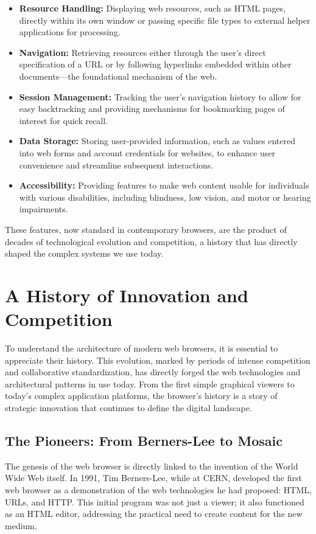 \documentclass{scrbook}
\begin{document}
\begin{itemize}
    \item \textbf{Resource Handling:} Displaying web resources, such as HTML pages, directly within its own window or passing specific file types to external helper applications for processing.
    \item \textbf{Navigation:} Retrieving resources either through the user's direct specification of a URL or by following hyperlinks embedded within other documents—the foundational mechanism of the web.
    \item \textbf{Session Management:} Tracking the user's navigation history to allow for easy backtracking and providing mechanisms for bookmarking pages of interest for quick recall.
    \item \textbf{Data Storage:} Storing user-provided information, such as values entered into web forms and account credentials for websites, to enhance user convenience and streamline subsequent interactions.
    \item \textbf{Accessibility:} Providing features to make web content usable for individuals with various disabilities, including blindness, low vision, and motor or hearing impairments.
\end{itemize}

These features, now standard in contemporary browsers, are the product of decades of technological evolution and competition, a history that has directly shaped the complex systems we use today.

\chapter{A History of Innovation and Competition}

To understand the architecture of modern web browsers, it is essential to appreciate their history. This evolution, marked by periods of intense competition and collaborative standardization, has directly forged the web technologies and architectural patterns in use today. From the first simple graphical viewers to today's complex application platforms, the browser's history is a story of strategic innovation that continues to define the digital landscape.

\section{The Pioneers: From Berners-Lee to Mosaic}

The genesis of the web browser is directly linked to the invention of the World Wide Web itself. In 1991, Tim Berners-Lee, while at CERN, developed the first web browser as a demonstration of the web technologies he had proposed: HTML, URLs, and HTTP. This initial program was not just a viewer; it also functioned as an HTML editor, addressing the practical need to create content for the new medium. \\
\end{document}

